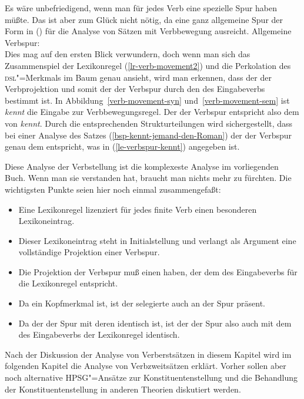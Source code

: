 Es wäre unbefriedigend, wenn man für jedes Verb eine spezielle Spur haben müßte. Das ist aber 
zum Glück nicht nötig, da eine ganz allgemeine Spur der Form in () für die Analyse
von Sätzen mit Verbbewegung ausreicht.
\eas
Allgemeine Verbspur:\\
\label{le-verbspur}
\zs
Dies mag auf den ersten Blick verwundern, doch wenn man sich das Zusammenspiel der Lexikonregel
(\ref{lr-verb-movement2}) und die Perkolation des \textsc{dsl}"=Merkmals im Baum genau ansieht, wird
man erkennen, dass der \dslw der Verbprojektion und somit der \localw der Verbspur durch den
\localw des Eingabeverbs bestimmt ist. In Abbildung~\ref{verb-movement-syn} und~\ref{verb-movement-sem}
ist \emph{kennt} die Eingabe zur Verbbewegungsregel. Der \localw der Verbspur entspricht
also dem \localw von \emph{kennt}. Durch die entsprechenden Strukturteilungen wird  sichergestellt,
dass bei einer Analyse des Satzes (\ref{bsp-kennt-jemand-den-Roman}) der \localw der Verbspur genau dem entspricht, was in
(\ref{le-verbspur-kennt}) angegeben ist.

Diese Analyse der Verbstellung ist die komplexeste Analyse im vorliegenden Buch. Wenn man sie verstanden
hat, braucht man nichts mehr zu fürchten. Die wichtigsten Punkte seien hier noch einmal zusammengefaßt:
\begin{itemize}
\item Eine Lexikonregel lizenziert für jedes finite Verb einen besonderen Lexikoneintrag.
\item Dieser Lexikoneintrag steht in Initialstellung und verlangt als Argument eine vollständige Projektion
      einer Verbspur.
\item Die Projektion der Verbspur muß einen \dslw haben, der dem \localw des Eingabeverbs für die Lexikonregel
      entspricht.
\item Da \dsl ein Kopfmerkmal ist, ist der selegierte \dslw auch an der Spur präsent.
\item Da der \dslw der Spur mit deren \localw identisch ist, ist der \localw der Spur also
      auch mit dem \localw des Eingabeverbs der Lexikonregel identisch.
\end{itemize}

\noindent
Nach der Diskussion der Analyse von Verberstsätzen in diesem Kapitel wird im folgenden Kapitel
die Analyse von Verbzweitsätzen erklärt. Vorher sollen aber noch alternative HPSG"=Ansätze zur Konstituentenstellung
und die Behandlung der Konstituentenstellung in anderen Theorien diskutiert werden.

